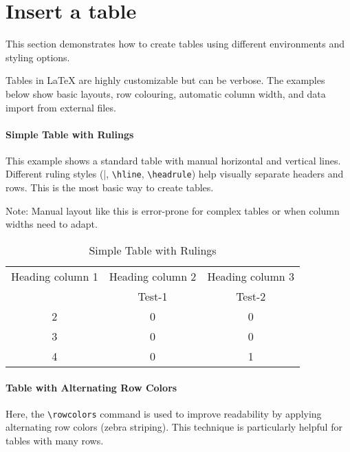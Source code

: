 \section{Insert a table}

    This section demonstrates how to create tables using different environments and styling options.

    Tables in \LaTeX{} are highly customizable but can be verbose. The examples below show basic layouts, row colouring, automatic column width, and data import from external files.

\paragraph{Simple Table with Rulings}
    This example shows a standard table with manual horizontal and vertical lines. Different ruling styles (|, \verb|\hline|, \verb|\headrule|) help visually separate headers and rows. This is the most basic way to create tables.

    Note: Manual layout like this is error-prone for complex tables or when column widths need to adapt.

    \begin{table}[H]
    	\centering
    	\caption{Simple Table with Rulings}
    	\begin{tabular}{c|c||c}
    		Heading column 1 & Heading column 2 & Heading column 3 \\ \headrule
    		       1         &      Test-1      &      Test-2      \\ \hline
    		       2         &        0         &        0         \\
    		       3         &        0         &        0         \\
    		       4         &        0         &        1         \\
    	\end{tabular}
    	\label{tab:table-rulings}
    \end{table}

\paragraph{Table with Alternating Row Colors}
    Here, the \verb|\rowcolors| command is used to improve readability by applying alternating row colors (zebra striping). This technique is particularly helpful for tables with many rows.

